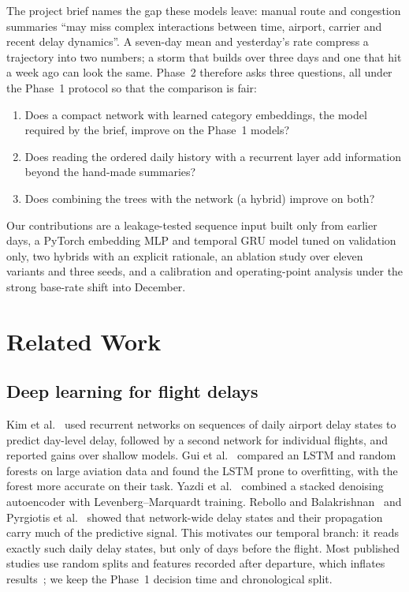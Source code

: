 \documentclass[conference]{IEEEtran}
\begin{document}
The project brief names the gap these models leave: manual route and congestion
summaries ``may miss complex interactions between time, airport, carrier and recent
delay dynamics''. A seven-day mean and yesterday's rate compress a trajectory into two
numbers; a storm that builds over three days and one that hit a week ago can look the
same. Phase~2 therefore asks three questions, all under the Phase~1 protocol so that
the comparison is fair:
\begin{enumerate}
\item Does a compact network with learned category embeddings, the model required by
  the brief, improve on the Phase~1 models?
\item Does reading the ordered daily history with a recurrent layer add information
  beyond the hand-made summaries?
\item Does combining the trees with the network (a hybrid) improve on both?
\end{enumerate}
Our contributions are a leakage-tested sequence input built only from earlier days,
a PyTorch embedding MLP and temporal GRU model tuned on validation only, two hybrids
with an explicit rationale, an ablation study over eleven variants and three seeds, and
a calibration and operating-point analysis under the strong base-rate shift into
December.

\section{Related Work}
\subsection{Deep learning for flight delays}
Kim et al.~\cite{kim2016deep} used recurrent networks on sequences of daily airport
delay states to predict day-level delay, followed by a second network for individual
flights, and reported gains over shallow models. Gui et al.~\cite{gui2020} compared an
LSTM and random forests on large aviation data and found the LSTM prone to overfitting,
with the forest more accurate on their task. Yazdi et al.~\cite{yazdi2020} combined a
stacked denoising autoencoder with Levenberg--Marquardt training. Rebollo and
Balakrishnan~\cite{rebollo2014} and Pyrgiotis et al.~\cite{pyrgiotis2013} showed that
network-wide delay states and their propagation carry much of the predictive signal.
This motivates our temporal branch: it reads exactly such daily delay states, but only
of days before the flight. Most published studies use random splits and features
recorded after departure, which inflates results~\cite{kaufman2012leakage}; we keep the
Phase~1 decision time and chronological split.
\end{document}
